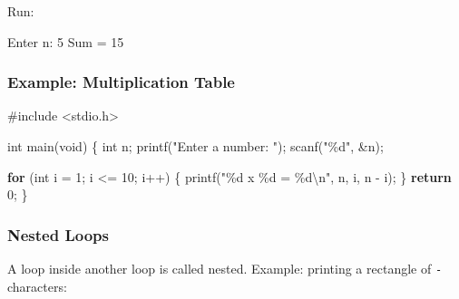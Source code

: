 \documentclass[
  letterpaper,
  DIV=11,
  numbers=noendperiod]{scrreprt}
\newenvironment{Shaded}{\begin{snugshade}}{\end{snugshade}}
\newcommand{\ControlFlowTok}[1]{\textcolor[rgb]{0.00,0.23,0.31}{\textbf{#1}}}
\newcommand{\DataTypeTok}[1]{\textcolor[rgb]{0.68,0.00,0.00}{#1}}
\newcommand{\DecValTok}[1]{\textcolor[rgb]{0.68,0.00,0.00}{#1}}
\newcommand{\ExtensionTok}[1]{\textcolor[rgb]{0.00,0.23,0.31}{#1}}
\newcommand{\ImportTok}[1]{\textcolor[rgb]{0.00,0.46,0.62}{#1}}
\newcommand{\NormalTok}[1]{\textcolor[rgb]{0.00,0.23,0.31}{#1}}
\newcommand{\OperatorTok}[1]{\textcolor[rgb]{0.37,0.37,0.37}{#1}}
\newcommand{\PreprocessorTok}[1]{\textcolor[rgb]{0.68,0.00,0.00}{#1}}
\newcommand{\SpecialCharTok}[1]{\textcolor[rgb]{0.37,0.37,0.37}{#1}}
\newcommand{\StringTok}[1]{\textcolor[rgb]{0.13,0.47,0.30}{#1}}
\begin{document}
Run:

\begin{Shaded}
\begin{Highlighting}[]
\ExtensionTok{Enter}\NormalTok{ n: 5}
\ExtensionTok{Sum}\NormalTok{ = 15}
\end{Highlighting}
\end{Shaded}

\subsubsection{Example: Multiplication
Table}\label{example-multiplication-table}

\begin{Shaded}
\begin{Highlighting}[]
\PreprocessorTok{\#include }\ImportTok{\textless{}stdio.h\textgreater{}}

\DataTypeTok{int}\NormalTok{ main}\OperatorTok{(}\DataTypeTok{void}\OperatorTok{)} \OperatorTok{\{}
    \DataTypeTok{int}\NormalTok{ n}\OperatorTok{;}
\NormalTok{    printf}\OperatorTok{(}\StringTok{"Enter a number: "}\OperatorTok{);}
\NormalTok{    scanf}\OperatorTok{(}\StringTok{"}\SpecialCharTok{\%d}\StringTok{"}\OperatorTok{,} \OperatorTok{\&}\NormalTok{n}\OperatorTok{);}

    \ControlFlowTok{for} \OperatorTok{(}\DataTypeTok{int}\NormalTok{ i }\OperatorTok{=} \DecValTok{1}\OperatorTok{;}\NormalTok{ i }\OperatorTok{\textless{}=} \DecValTok{10}\OperatorTok{;}\NormalTok{ i}\OperatorTok{++)} \OperatorTok{\{}
\NormalTok{        printf}\OperatorTok{(}\StringTok{"}\SpecialCharTok{\%d}\StringTok{ x }\SpecialCharTok{\%d}\StringTok{ = }\SpecialCharTok{\%d\textbackslash{}n}\StringTok{"}\OperatorTok{,}\NormalTok{ n}\OperatorTok{,}\NormalTok{ i}\OperatorTok{,}\NormalTok{ n }\OperatorTok{{-}}\NormalTok{ i}\OperatorTok{);}
    \OperatorTok{\}}
    \ControlFlowTok{return} \DecValTok{0}\OperatorTok{;}
\OperatorTok{\}}
\end{Highlighting}
\end{Shaded}

\subsubsection{Nested Loops}\label{nested-loops}

A loop inside another loop is called nested. Example: printing a
rectangle of \texttt{-} characters:
\end{document}
